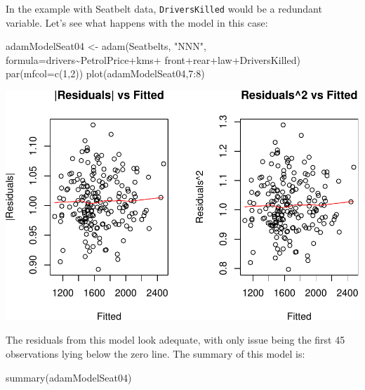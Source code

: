\documentclass[
]{book}
\newenvironment{Shaded}{\begin{snugshade}}{\end{snugshade}}
\newcommand{\AttributeTok}[1]{\textcolor[rgb]{0.77,0.63,0.00}{#1}}
\newcommand{\DecValTok}[1]{\textcolor[rgb]{0.00,0.00,0.81}{#1}}
\newcommand{\FunctionTok}[1]{\textcolor[rgb]{0.00,0.00,0.00}{#1}}
\newcommand{\NormalTok}[1]{#1}
\newcommand{\OtherTok}[1]{\textcolor[rgb]{0.56,0.35,0.01}{#1}}
\newcommand{\SpecialCharTok}[1]{\textcolor[rgb]{0.00,0.00,0.00}{#1}}
\newcommand{\StringTok}[1]{\textcolor[rgb]{0.31,0.60,0.02}{#1}}
\theoremstyle{definition}
\theoremstyle{definition}
\theoremstyle{definition}
\theoremstyle{definition}
\theoremstyle{remark}
\begin{document}
In the example with Seatbelt data, \texttt{DriversKilled} would be a redundant variable. Let's see what happens with the model in this case:

\begin{Shaded}
\begin{Highlighting}[]
\NormalTok{adamModelSeat04 }\OtherTok{\textless{}{-}} \FunctionTok{adam}\NormalTok{(Seatbelts, }\StringTok{"NNN"}\NormalTok{, }
                        \AttributeTok{formula=}\NormalTok{drivers}\SpecialCharTok{\textasciitilde{}}\NormalTok{PetrolPrice}\SpecialCharTok{+}\NormalTok{kms}\SpecialCharTok{+}
\NormalTok{                          front}\SpecialCharTok{+}\NormalTok{rear}\SpecialCharTok{+}\NormalTok{law}\SpecialCharTok{+}\NormalTok{DriversKilled)}
\FunctionTok{par}\NormalTok{(}\AttributeTok{mfcol=}\FunctionTok{c}\NormalTok{(}\DecValTok{1}\NormalTok{,}\DecValTok{2}\NormalTok{))}
\FunctionTok{plot}\NormalTok{(adamModelSeat04,}\DecValTok{7}\SpecialCharTok{:}\DecValTok{8}\NormalTok{)}
\end{Highlighting}
\end{Shaded}

\includegraphics{adam_files/figure-latex/unnamed-chunk-134-1.pdf}

The residuals from this model look adequate, with only issue being the first 45 observations lying below the zero line. The summary of this model is:

\begin{Shaded}
\begin{Highlighting}[]
\FunctionTok{summary}\NormalTok{(adamModelSeat04)}
\end{Highlighting}
\end{Shaded}
\end{document}
